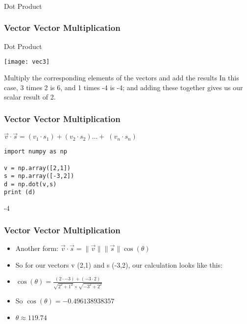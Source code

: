 \begin{frame}[fragile]\frametitle{}
\begin{center}
{\Large Dot Product}
\end{center}
\end{frame}



 \begin{frame}[fragile] \frametitle{Vector Vector Multiplication}
Dot Product
\begin{center}
\texttt{[image: vec3]}
\end{center}

Multiply the corresponding elements of the vectors and add the results In this
case, 3 times 2 is 6, and 1 times -4 is -4; and adding these together
gives us our scalar result of 2. 

\end{frame}


 \begin{frame}[fragile] \frametitle{Vector Vector Multiplication}

$\vec{v} \cdot \vec{s} = (v_{1} \cdot s_{1}) + (v_{2} \cdot s_{2}) ... + \; (v_{n} \cdot s_{n})$
 
 \begin{lstlisting}
import numpy as np

v = np.array([2,1])
s = np.array([-3,2])
d = np.dot(v,s)
print (d)
 \end{lstlisting}
 
-4
 
\end{frame}


 \begin{frame}[fragile] \frametitle{Vector Vector Multiplication}

 \begin{itemize}
 
\item Another form: $\vec{v} \cdot \vec{s} = \|\vec{v} \|\|\vec{s}\| \cos (\theta)$ 

\item So for our vectors v (2,1) and s (-3,2), our calculation looks like this:

\item $\cos(\theta) = \frac{(2 \cdot-3) + (-3 \cdot 2)}{\sqrt{2^{2} + 1^{2}} \times \sqrt{-3^{2} + 2^{2}}}$

\item So $\cos(\theta) = -0.496138938357$

\item $\theta \approx 119.74$
\end{itemize}
 
\end{frame}

